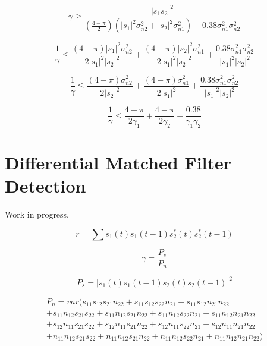 \documentclass[11pt]{article}
\begin{document}
\begin{equation}
\gamma \geq \frac{|s_1 s_2|^2}{
\left(
\frac{4-\pi}{2}
\right)
\left(
|s_1|^2 \sigma_{n2}^2 + |s_2|^2 \sigma_{n1}^2
\right)
 +
0.38 \sigma_{n1}^2 \sigma_{n2}^2}
\end{equation}


\begin{equation}
\frac{1}{\gamma}
\leq
\frac{\left( 4-\pi \right) |s_1|^2 \sigma_{n2}^2}
{2|s_1|^2|s_2|^2}
+
\frac{\left( 4-\pi \right) |s_2|^2 \sigma_{n1}^2}
{2|s_1|^2|s_2|^2}
+
\frac{0.38\sigma_{n1}^2 \sigma_{n2}^2}
{|s_1|^2|s_2|^2}
\end{equation}


\begin{equation}
\frac{1}{\gamma}
\leq
\frac{\left( 4-\pi \right) \sigma_{n2}^2}
{2|s_2|^2}
+
\frac{\left( 4-\pi \right) \sigma_{n1}^2}
{2|s_1|^2}
+
\frac{0.38\sigma_{n1}^2 \sigma_{n2}^2}
{|s_1|^2|s_2|^2}
\end{equation}


\begin{equation}
\boxed{
\frac{1}{\gamma}
\leq
\frac{4-\pi}
{2 \gamma_1}
+
\frac{4-\pi}
{2 \gamma_2}
+
\frac{0.38}
{\gamma_1 \gamma_2}
}
\end{equation}


\section{Differential Matched Filter Detection}

Work in progress.

\begin{equation}
r = \sum s_1(t)s_1(t-1) s_2^*(t) s_2^*(t-1)
\end{equation}


\begin{equation}
\gamma
=
\frac{P_s}{P_n}
\end{equation}

\begin{equation}
P_s = |s_1(t)s_1(t-1)s_2(t)s_2(t-1)|^2
\end{equation}

\begin{align}
P_n = var(s_{11}s_{12}s_{21}n_{22} + s_{11}s_{12}s_{22}n_{21} + s_{11}s_{12}n_{21}n_{22}\\
  + s_{11}n_{12}s_{21}s_{22} + s_{11}n_{12}s_{21}n_{22} + s_{11}n_{12}s_{22}n_{21} + s_{11}n_{12}n_{21}n_{22}\\
  + s_{12}n_{11}s_{21}s_{22} + s_{12}n_{11}s_{21}n_{22} + s_{12}n_{11}s_{22}n_{21} + s_{12}n_{11}n_{21}n_{22}\\
  + n_{11}n_{12}s_{21}s_{22} + n_{11}n_{12}s_{21}n_{22} + n_{11}n_{12}s_{22}n_{21} + n_{11}n_{12}n_{21}n_{22})
\end{align}
\end{document}
